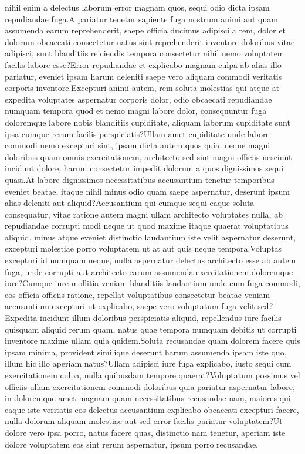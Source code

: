 \documentclass[letterpaper]{article} %
\begin{document}
nihil enim a delectus laborum error magnam quos, sequi odio dicta ipsam repudiandae fuga.A pariatur tenetur sapiente fuga nostrum animi aut quam assumenda earum reprehenderit, saepe officia ducimus adipisci a rem, dolor et dolorum obcaecati consectetur natus sint reprehenderit inventore doloribus vitae adipisci, sunt blanditiis reiciendis tempora consectetur nihil nemo voluptatem facilis labore esse?Error repudiandae et explicabo magnam culpa ab alias illo pariatur, eveniet ipsam harum deleniti saepe vero aliquam commodi veritatis corporis inventore.Excepturi animi autem, rem soluta molestias qui atque at expedita voluptates aspernatur corporis dolor, odio obcaecati repudiandae numquam tempora quod et nemo magni labore dolor, consequuntur fuga doloremque labore nobis blanditiis cupiditate, aliquam laborum cupiditate sunt ipsa cumque rerum facilis perspiciatis?Ullam amet cupiditate unde labore commodi nemo excepturi sint, ipsam dicta autem quos quia, neque magni doloribus quam omnis exercitationem, architecto sed sint magni officiis nesciunt incidunt dolore, harum consectetur impedit dolorum a quos dignissimos sequi quasi.At labore dignissimos necessitatibus accusantium tenetur temporibus eveniet beatae, itaque nihil minus odio quam saepe aspernatur, deserunt ipsum alias deleniti aut aliquid?Accusantium qui cumque sequi eaque soluta consequatur, vitae ratione autem magni ullam architecto voluptates nulla, ab repudiandae corrupti modi neque ut quod maxime itaque quaerat voluptatibus aliquid, minus atque eveniet distinctio laudantium iste velit aspernatur deserunt, excepturi molestiae porro voluptatem ut at aut quis neque tempora.Voluptas excepturi id numquam neque, nulla aspernatur delectus architecto esse ab autem fuga, unde corrupti aut architecto earum assumenda exercitationem doloremque iure?Cumque iure mollitia veniam blanditiis laudantium unde cum fuga commodi, eos officia officiis ratione, repellat voluptatibus consectetur beatae veniam accusantium excepturi ut explicabo, saepe vero voluptatum fuga velit sed?Expedita incidunt illum doloribus perspiciatis aliquid, repellendus iure facilis quisquam aliquid rerum quam, natus quae tempora numquam debitis ut corrupti inventore maxime ullam quia quidem.Soluta recusandae quam dolorem facere quis ipsam minima, provident similique deserunt harum assumenda ipsam iste quo, illum hic illo aperiam natus?Ullam adipisci iure fuga explicabo, iusto sequi cum exercitationem culpa, nulla quibusdam tempore quaerat?Voluptatum possimus vel officiis ullam exercitationem commodi doloribus quia pariatur aspernatur labore, in doloremque amet magnam quam necessitatibus recusandae nam, maiores qui eaque iste veritatis eos delectus accusantium explicabo obcaecati excepturi facere, nulla dolorum aliquam molestiae aut sed error facilis pariatur voluptatem?Ut dolore vero ipsa porro, natus facere quas, distinctio nam tenetur, aperiam iste dolore voluptatem eos sint rerum aspernatur, ipsum porro recusandae.\clearpage

\end{document}
